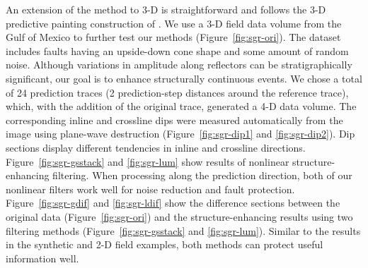 An extension of the method to 3-D is straightforward and follows
the 3-D predictive painting construction of \cite{Fomel08a}. We use a
3-D field data volume from the Gulf of Mexico to further test our
methods (Figure~\ref{fig:sgr-ori}). The dataset includes faults having
an upside-down cone shape and some amount of random noise. Although
variations in amplitude along reflectors can be stratigraphically
significant, our goal is to enhance structurally continuous events.
We chose a total of 24 prediction traces (2 prediction-step distances
around the reference trace), which, with the addition of the original
trace, generated a 4-D data volume. The corresponding inline and
crossline dips were measured automatically from the image using
plane-wave destruction (Figure~\ref{fig:sgr-dip1} and
\ref{fig:sgr-dip2}). Dip sections display different tendencies in
inline and crossline directions. Figure~\ref{fig:sgr-gsstack} and
\ref{fig:sgr-lum} show results of nonlinear
structure-enhancing filtering. When processing along the prediction
direction, both of our nonlinear filters work well
for noise reduction and fault
protection. Figure~\ref{fig:sgr-gdif} and \ref{fig:sgr-ldif} show
the difference sections between the original data
(Figure~\ref{fig:sgr-ori}) and the structure-enhancing results using
two filtering methods (Figure~\ref{fig:sgr-gsstack} and
\ref{fig:sgr-lum}). Similar to the results in the synthetic and 2-D
field examples, both methods can protect useful information well.

 






